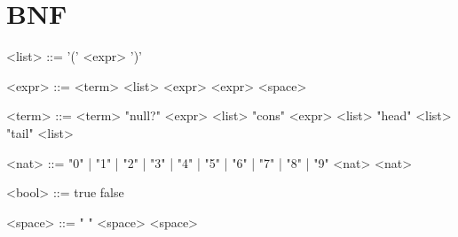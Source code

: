 \documentclass[]{article}
\date{May 05, 2017}
\begin{document}
  \section{BNF}
  \setlength{\grammarparsep}{20pt}
  \setlength{\grammarindent}{8em}
  \begin{grammar}
    <list>    ::= '(' <expr> ')'

    <expr>    ::=  <term>
              \alt <list>
              \alt <expr> <expr>
              \alt <space>

    <term>    ::=  <term>
              \alt "null?" <expr> <list>
              \alt "cons"  <expr> <list> 
              \alt "head"  <list>
              \alt "tail"  <list>

    <nat>     ::=  "0" | "1" | "2" | "3" | "4" | "5" | "6" | "7" | "8" | "9" 
              \alt <nat> <nat>

    <bool>    ::=  true 
              \alt false 

    <space>   ::=  " "
              \alt <space> <space>
  \end{grammar}
\end{document}
